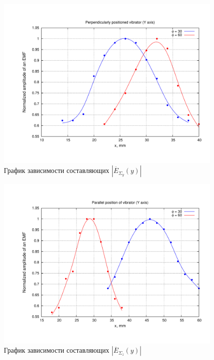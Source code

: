 \documentclass[11pt,a4paper,oneside, titlepage,reqno]{amsproc}
\begin{document}
\begin{figure}[hb!]
    \begin{center}
        \includegraphics[width=\textwidth]{plot3.pdf}
    \end{center}
    \vspace {-20 pt}
    \caption{График зависимости составляющих $|\overline{E}_{\Sigma_y}(y)|$}
    \label{fig:plot3}
\end{figure}

\begin{figure}[h!]
    \begin{center}
        \includegraphics[width=\textwidth]{plot4.pdf}
    \end{center}
    \vspace {-20 pt}
    \caption{График зависимости составляющих $|\overline{E}_{\Sigma_z}(y)|$}
    \label{fig:plot4}
\end{figure}
\end{document}

